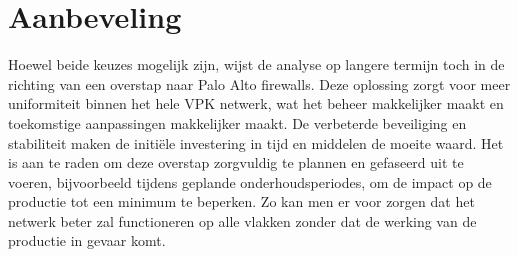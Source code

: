 \section{Aanbeveling}
Hoewel beide keuzes mogelijk zijn, wijst de analyse op langere termijn toch in de richting van een overstap naar Palo Alto firewalls. Deze oplossing zorgt voor meer uniformiteit binnen het hele VPK netwerk, wat het beheer makkelijker maakt en toekomstige aanpassingen makkelijker maakt. De verbeterde beveiliging en stabiliteit maken de initiële investering in tijd en middelen de moeite waard.
Het is aan te raden om deze overstap zorgvuldig te plannen en gefaseerd uit te voeren, bijvoorbeeld tijdens geplande onderhoudsperiodes, om de impact op de productie tot een minimum te beperken. Zo kan men er voor zorgen dat het netwerk beter zal functioneren op alle vlakken zonder dat de werking van de productie in gevaar komt.



